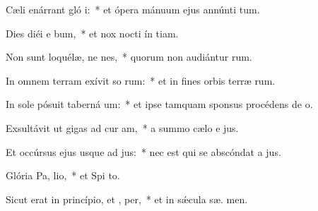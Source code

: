 \item Cæli enárrant gló i:~* et ópera mánuum ejus annúnti tum.
\item Dies diéi e bum,~* et nox nocti ín tiam.
\item Non sunt loquélæ, ne nes,~* quorum non audiántur  rum.
\item In omnem terram exívit so rum:~* et in fines orbis terræ  rum.
\item In sole pósuit taberná um:~* et ipse tamquam sponsus procédens de  o.
\item Exsultávit ut gigas ad cur am,~* a summo cælo e jus.
\item Et occúrsus ejus usque ad  jus:~* nec est qui se abscóndat a  jus.
\item Glória Pa,  lio,~* et Spi to.
\item Sicut erat in princípio, et ,  per,~* et in sǽcula sæ. men.
